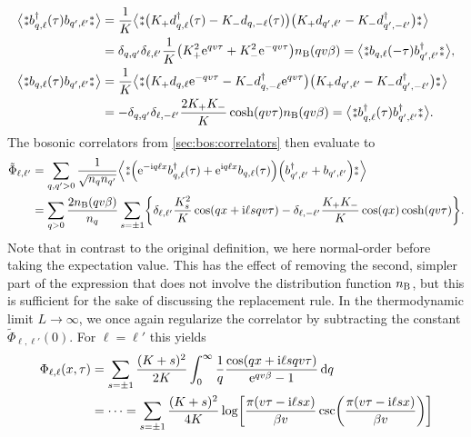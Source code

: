 \begin{align*}
\bra[\big]{\varnormord{b_{q,\ell}^\dagger(\tau) b_{q',\ell'}}} &= \frac{1}{K} \bra[\big]{\varnormord{\kla[\big]{K_+ d_{q,\ell}^\dagger (\tau) - K_- d_{q,-\ell}(\tau)} \kla[\big]{K_+ d_{q',\ell'} - K_- d_{q',-\ell'}^\dagger}}}\\
&= \delta_{q,q'} \delta_{\ell,\ell'} \frac{1}{K} \kla[\big]{K_+^2 \powe{qv\tau} + K_-^2 \powe{-qv\tau}} n_\B(qv\beta) = \bra[\big]{\varnormord{b_{q,\ell}(-\tau) b_{q',\ell'}^\dagger}},\\
\bra[\big]{\varnormord{b_{q,\ell}(\tau) b_{q',\ell'}}} &= \frac{1}{K} \bra[\big]{\varnormord{\kla[\big]{K_+ d_{q,\ell} \powe{-qv\tau} - K_- d_{q,-\ell}^\dagger \powe{qv\tau}} \kla[\big]{K_+ d_{q',\ell'} - K_- d_{q',-\ell'}^\dagger}}}\\
&= -\delta_{q,q'} \delta_{\ell,-\ell'} \frac{2K_+K_-}{K} \cosh(qv\tau) n_\B(qv\beta) = \bra[\big]{\varnormord{b_{q,\ell}^\dagger(\tau) b_{q',\ell'}^\dagger}}.
\end{align*}
The bosonic correlators from \autoref{sec:bos:correlators} then evaluate to
\begin{align*}
\tilde{\Phi}_{\ell,\ell'} &= \sum_{q,q'>0} \frac{1}{\sqrt{n_qn_{q'}}} \bra*{\varnormord{\kla*{\powe{-\i q\ell x} b_{q,\ell}^\dagger(\tau) + \powe{\i q\ell x} b_{q,\ell}(\tau)} \kla*{b_{q',\ell'}^\dagger + b_{q',\ell'}}}}\\
&= \sum_{q>0} \frac{2n_\B(qv\beta)}{n_q} \sum_{s=\pm 1} \klc[\bigg]{\delta_{\ell,\ell'} \frac{K_s^2}{K} \cos\kla*{qx + \i \ell s qv\tau} - \delta_{\ell,-\ell'} \frac{K_+K_-}{K} \cos(qx) \cosh(qv\tau)}.
\end{align*} %
Note that in contrast to the original definition, we here normal-order before taking the expectation value.
This has the effect of removing the second, simpler part of the expression that does not involve the distribution function $n_{\text{B}}$, but this is sufficient for the sake of discussing the replacement rule.
In the thermodynamic limit $L\rightarrow \infty$, we once again regularize the correlator by subtracting the constant $\tilde{\Phi}_{\ell,\ell'}(0)$.
For $\ell=\ell'$ this yields
\begin{align*}
\Phi_{\ell,\ell}(x,\tau) &= \sum_{s=\pm 1} \frac{(K+s)^2}{2K} \intx{0}{\infty}{\frac{1}{q} \frac{\cos(qx + \i\ell sqv\tau)}{\powe{qv\beta} - 1}}{q}\\
&= \dots = \sum_{s=\pm 1} \frac{(K+s)^2}{4K} \log\klb*{\frac{\pi (v\tau - \i\ell sx)}{\beta v} \csc\kla*{\frac{\pi (v\tau - \i\ell sx)}{\beta v}}}
\end{align*}
